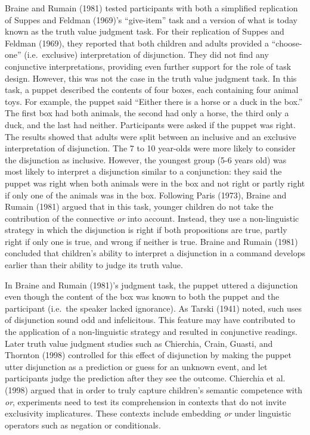 \documentclass[
  english,
  ,man,floatsintext]{apa6}
\begin{document}
Braine and Rumain (1981) tested participants with both a simplified replication of Suppes and Feldman (1969)'s \enquote{give-item} task and a version of what is today known as the truth value judgment task. For their replication of Suppes and Feldman (1969), they reported that both children and adults provided a \enquote{choose-one} (i.e.~exclusive) interpretation of disjunction. They did not find any conjunctive interpretations, providing even further support for the role of task design. However, this was not the case in the truth value judgment task. In this task, a puppet described the contents of four boxes, each containing four animal toys. For example, the puppet said \enquote{Either there is a horse or a duck in the box.} The first box had both animals, the second had only a horse, the third only a duck, and the last had neither. Participants were asked if the puppet was right. The results showed that adults were split between an inclusive and an exclusive interpretation of disjunction. The 7 to 10 year-olds were more likely to consider the disjunction as inclusive. However, the youngest group (5-6 years old) was most likely to interpret a disjunction similar to a conjunction: they said the puppet was right when both animals were in the box and not right or partly right if only one of the animals was in the box. Following Paris (1973), Braine and Rumain (1981) argued that in this task, younger children do not take the contribution of the connective \emph{or} into account. Instead, they use a non-linguistic strategy in which the disjunction is right if both propositions are true, partly right if only one is true, and wrong if neither is true. Braine and Rumain (1981) concluded that children's ability to interpret a disjunction in a command develops earlier than their ability to judge its truth value.

In Braine and Rumain (1981)'s judgment task, the puppet uttered a disjunction even though the content of the box was known to both the puppet and the participant (i.e.~the speaker lacked ignorance). As Tarski (1941) noted, such uses of disjunction sound odd and infelicitous. This feature may have contributed to the application of a non-linguistic strategy and resulted in conjunctive readings. Later truth value judgment studies such as Chierchia, Crain, Guasti, and Thornton (1998) controlled for this effect of disjunction by making the puppet utter disjunction as a prediction or guess for an unknown event, and let participants judge the prediction after they see the outcome. Chierchia et al. (1998) argued that in order to truly capture children's semantic competence with \emph{or}, experiments need to test its comprehension in contexts that do not invite exclusivity implicatures. These contexts include embedding \emph{or} under linguistic operators such as negation or conditionals.
\end{document}
